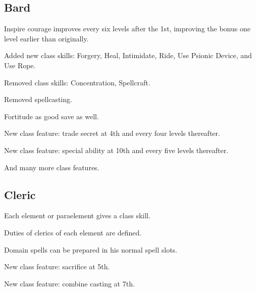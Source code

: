 \subsection{Bard}
\begin{itemize*}
\item Inspire courage improves every six levels after the 1st, improving the bonus one level earlier than originally.
\item Added new class skills: Forgery, Heal, Intimidate, Ride, Use Psionic Device, and Use Rope.
\item Removed class skills: Concentration, Spellcraft.
\item Removed spellcasting.
\item Fortitude as good save as well.
\item New class feature: trade secret at 4th and every four levels thereafter.
\item New class feature: special ability at 10th and every five levels thereafter.
\item And many more class features.
\end{itemize*}

\subsection{Cleric}
\begin{itemize*}
\item Each element or paraelement gives a class skill.
\item Duties of clerics of each element are defined.
\item Domain spells can be prepared in his normal spell slots.
\item New class feature: sacrifice at 5th.
\item New class feature: combine casting at 7th.
\end{itemize*}

